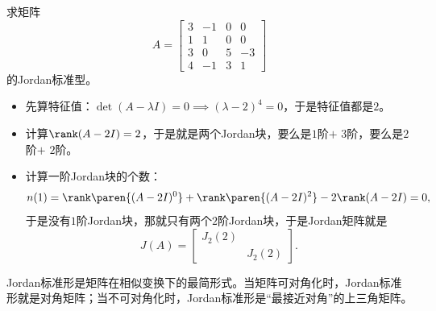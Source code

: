 \begin{example}
    求矩阵
    \begin{equation}
        A = \begin{bmatrix}
            3 & -1 & 0 & 0 \\
            1 & 1  & 0 & 0 \\
            3 & 0  & 5 & -3 \\
            4 & -1 & 3 & 1
        \end{bmatrix}
    \end{equation}
    的Jordan标准型。

    \begin{itemize}
        \item 先算特征值：$\det(A - \lambda I) = 0 \implies (\lambda - 2)^4 = 0$，于是特征值都是$2$。
        \item 计算$\rank(A - 2I) = 2$，于是就是两个Jordan块，要么是$1$阶$+$ $3$阶，要么是$2$阶$+$ $2$阶。
        \item 计算一阶Jordan块的个数：
        \begin{equation}
            n(1) = \rank\paren{(A-2I)^0} + \rank\paren{(A-2I)^2} - 2\rank(A-2I) = 0,
        \end{equation}
        于是没有$1$阶Jordan块，那就只有两个$2$阶Jordan块，于是Jordan矩阵就是
        \begin{equation}
            J(A) = \begin{bmatrix}
                J_2(2) &        \\
                       & J_2(2)
            \end{bmatrix}.
        \end{equation}
    \end{itemize}
\end{example}

Jordan标准形是矩阵在相似变换下的最简形式。当矩阵可对角化时，Jordan标准形就是对角矩阵；当不可对角化时，Jordan标准形是“最接近对角”的上三角矩阵。

